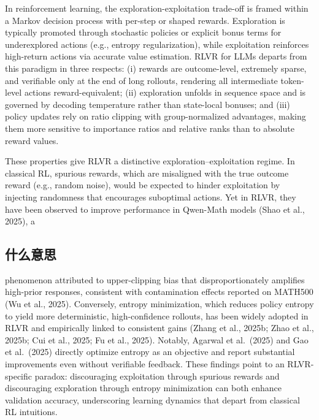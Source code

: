 \documentclass[
  10
]{article}
\begin{document}
In reinforcement learning, the exploration-exploitation trade-off is
framed within a Markov decision process with per-step or shaped rewards.
Exploration is typically promoted through stochastic policies or
explicit bonus terms for underexplored actions (e.g., entropy
regularization), while exploitation reinforces high-return actions via
accurate value estimation. RLVR for LLMs departs from this paradigm in
three respects: (i) rewards are outcome-level, extremely sparse, and
verifiable only at the end of long rollouts, rendering all intermediate
token-level actions reward-equivalent; (ii) exploration unfolds in
sequence space and is governed by decoding temperature rather than
state-local bonuses; and (iii) policy updates rely on ratio clipping
with group-normalized advantages, making them more sensitive to
importance ratios and relative ranks than to absolute reward values.

These properties give RLVR a distinctive exploration--exploitation
regime. In classical RL, spurious rewards, which are misaligned with the
true outcome reward (e.g., random noise), would be expected to hinder
exploitation by injecting randomness that encourages suboptimal actions.
Yet in RLVR, they have been observed to improve performance in Qwen-Math
models (Shao et al., 2025), a

\subsection{什么意思}\label{ux4ec0ux4e48ux610fux601d}

phenomenon attributed to upper-clipping bias that disproportionately
amplifies high-prior responses, consistent with contamination effects
reported on MATH500 (Wu et al., 2025). Conversely, entropy minimization,
which reduces policy entropy to yield more deterministic,
high-confidence rollouts, has been widely adopted in RLVR and
empirically linked to consistent gains (Zhang et al., 2025b; Zhao et
al., 2025b; Cui et al., 2025; Fu et al., 2025). Notably, Agarwal et
al.~(2025) and Gao et al.~(2025) directly optimize entropy as an
objective and report substantial improvements even without verifiable
feedback. These findings point to an RLVR-specific paradox: discouraging
exploitation through spurious rewards and discouraging exploration
through entropy minimization can both enhance validation accuracy,
underscoring learning dynamics that depart from classical RL intuitions.
\end{document}
